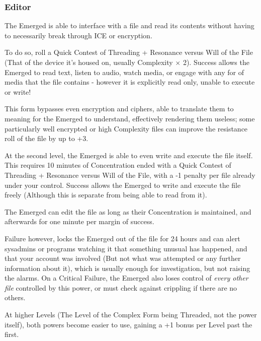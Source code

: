 \begin{multicols*}{3}
	\subsubsection*{Editor}\label{editor}
	
	The Emerged is able to interface with a file and read its contents without having to necessarily break through ICE or encryption.
	
	To do so, roll a Quick Contest of Threading + Resonance versus Will of the File (That of the device it's housed on, usually Complexity $\times$ 2). Success allows the Emerged to read text, listen to audio, watch media, or engage with any for of media that the file contains - however it is explicitly read only, unable to execute or write!
	
	This form bypasses even encryption and ciphers, able to translate them to meaning for the Emerged to understand, effectively rendering them useless; some particularly well encrypted or high Complexity files can improve the resistance roll of the file by up to +3.
	
	At the second level, the Emerged is able to even write and execute the file itself. This requires 10 minutes of Concentration ended with a Quick Contest of Threading + Resonance versus Will of the File, with a -1 penalty per file already under your control. Success allows the Emerged to write and execute the file freely (Although this is separate from being able to read from it).
	
	The Emerged can edit the file as long as their Concentration is maintained, and afterwards for one minute per margin of success.
	
	Failure however, locks the Emerged out of the file for 24 hours and can alert sysadmins or programs watching it that something unusual has happened, and that your account was involved (But not what was attempted or any further information about it), which is usually enough for investigation, but not raising the alarms. On a Critical Failure, the Emerged also loses control of \textit{every other file} controlled by this power, or must check against crippling if there are no others.
	
	At higher Levels (The Level of the Complex Form being Threaded, not the power itself), both powers become easier to use, gaining a +1 bonus per Level past the first.
	

\end{multicols*}
